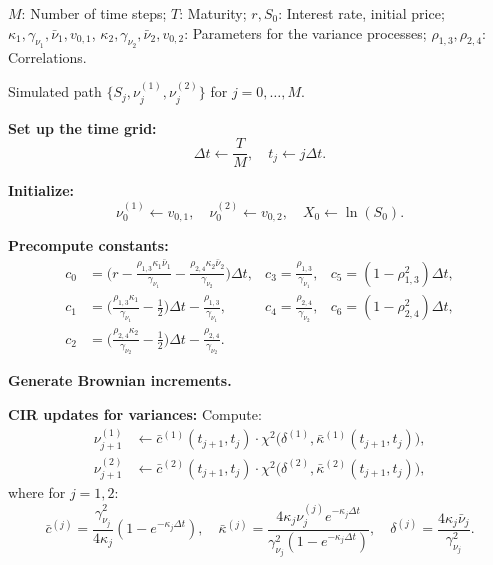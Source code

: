 \documentclass[]{interact}
\theoremstyle{plain}%
\theoremstyle{definition}
\theoremstyle{remark}
\begin{document}
\begin{algorithm}[H]
\caption{AES Scheme for the Double Heston Model}
\label{alg:DoubleHestonAES}
\begin{algorithmic}[1]

\Require 
$M$: Number of time steps; 
$T$: Maturity; 
$r, S_0$: Interest rate, initial price;
$\kappa_1, \gamma_{\nu_1}, \bar{\nu}_1, v_{0,1}$, $\kappa_2, \gamma_{\nu_2}, \bar{\nu}_2, v_{0,2}$: Parameters for the variance processes;
$\rho_{1,3}, \rho_{2,4}$: Correlations.

\Ensure Simulated path $\{S_j, \nu_j^{(1)}, \nu_j^{(2)}\}$ for $j=0,\dots,M$.

\vspace{0.5em}

\State \textbf{Set up the time grid:}
\[
  \Delta t \gets \frac{T}{M}, \quad t_j \gets j \Delta t.
\]

\State \textbf{Initialize:} 
\[
  \nu_0^{(1)} \gets v_{0,1}, \quad \nu_0^{(2)} \gets v_{0,2}, \quad X_0 \gets \ln(S_0).
\]

\State \textbf{Precompute constants:}
\[
\begin{aligned}
c_0 &= \biggl(r - \frac{\rho_{1,3}\kappa_1\bar{\nu}_1}{\gamma_{\nu_1}} - \frac{\rho_{2,4}\kappa_2\bar{\nu}_2}{\gamma_{\nu_2}}\biggr)\Delta t, & 
c_3 = \frac{\rho_{1,3}}{\gamma_{\nu_1}}, & 
c_5 = (1 - \rho_{1,3}^2)\Delta t, \\
c_1 &= \biggl(\frac{\rho_{1,3}\kappa_1}{\gamma_{\nu_1}} - \frac{1}{2}\biggr)\Delta t - \frac{\rho_{1,3}}{\gamma_{\nu_1}}, &
c_4 = \frac{\rho_{2,4}}{\gamma_{\nu_2}}, &
c_6 = (1 - \rho_{2,4}^2)\Delta t, \\
c_2 &= \biggl(\frac{\rho_{2,4}\kappa_2}{\gamma_{\nu_2}} - \frac{1}{2}\biggr)\Delta t - \frac{\rho_{2,4}}{\gamma_{\nu_2}}.
\end{aligned}
\]

\State \textbf{Generate Brownian increments.}


   \State \textbf{CIR updates for variances:}
   Compute:
\begin{align*}
     \nu_{j+1}^{(1)} &\gets \bar{c}^{(1)}(t_{j+1},t_j) \cdot \chi^2\bigl(\delta^{(1)}, \bar{\kappa}^{(1)}(t_{j+1},t_j)\bigr), \\
     \nu_{j+1}^{(2)} &\gets \bar{c}^{(2)}(t_{j+1},t_j) \cdot \chi^2\bigl(\delta^{(2)}, \bar{\kappa}^{(2)}(t_{j+1},t_j)\bigr),
\end{align*}
   where for $j=1,2$:
   \[
     \bar{c}^{(j)} = \frac{\gamma_{\nu_j}^2}{4\kappa_j}(1 - e^{-\kappa_j \Delta t}), \quad
     \bar{\kappa}^{(j)} = \frac{4\kappa_j \nu_j^{(j)}e^{-\kappa_j \Delta t}}{\gamma_{\nu_j}^2(1 - e^{-\kappa_j \Delta t})}, \quad
     \delta^{(j)} = \frac{4\kappa_j \bar{\nu}_j}{\gamma_{\nu_j}^2}.
   \]


\end{algorithmic}
\end{algorithm}
\end{document}
